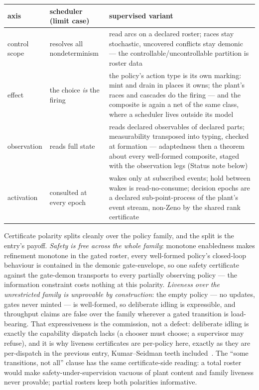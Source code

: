 \begin{center}\small
\begin{tabular}{@{}lp{4.2cm}p{6.2cm}@{}}
\toprule
axis & scheduler (limit case) & supervised variant \\
\midrule
control scope & resolves all nondeterminism & read arcs on a declared
roster; races stay stochastic, uncovered conflicts stay demonic ---
the controllable/uncontrollable partition is roster data \\
\addlinespace
effect & the choice \emph{is} the firing & the policy's action type
is its own marking: mint and drain in places it owns; the plant's
races and cascades do the firing --- and the composite is again a net
of the same class, where a scheduler lives outside its model \\
\addlinespace
observation & reads full state & reads declared observables of
declared parts; measurability transposed into typing, checked at
formation --- adaptedness then a theorem about every well-formed
composite, staged with the observation legs (Status note below) \\
\addlinespace
activation & consulted at every epoch & wakes only at subscribed
events; hold between wakes is read-no-consume; decision epochs are a
declared sub-point-process of the plant's event stream, non-Zeno by
the shared rank certificate \\
\bottomrule
\end{tabular}
\end{center}

Certificate polarity splits cleanly over the policy family, and the
split is the entry's payoff. \emph{Safety is free across the whole
family}: monotone enabledness makes refinement monotone in the gated
roster, every well-formed policy's closed-loop behaviour is contained
in the demonic gate-envelope, so one safety certificate against the
gate-demon transports to every partially observing policy --- the
information constraint costs nothing at this polarity.
\emph{Liveness over the unrestricted family is unprovable by
construction}: the empty policy --- no updates, gates never minted
--- is well-formed, so deliberate idling is expressible, and
throughput claims are false over the family wherever a gated
transition is load-bearing. That expressiveness is the commission,
not a defect: deliberate idling is exactly the capability dispatch
lacks (a chooser must choose; a supervisor may refuse), and it is why
liveness certificates are per-policy here, exactly as they are
per-dispatch in the previous entry, Kumar--Seidman teeth
included~\cite{kumar1990dynamic}.
The ``some transitions, not all'' clause has the same certificate-side
reading: a total roster would make safety-under-supervision vacuous
of plant content and family liveness never provable; partial rosters
keep both polarities informative.

